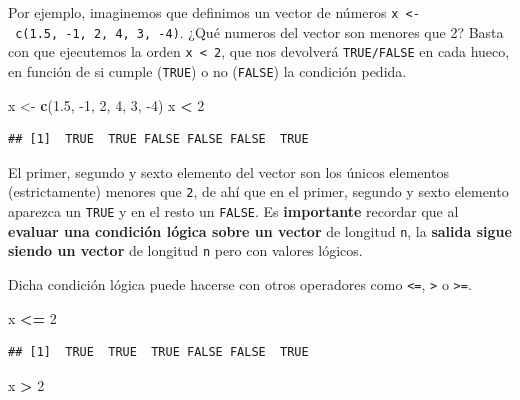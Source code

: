 \documentclass[11pt,]{book}
\newenvironment{Shaded}{\begin{snugshade}}{\end{snugshade}}
\newcommand{\DecValTok}[1]{\textcolor[rgb]{0.06,0.06,0.06}{#1}}
\newcommand{\FloatTok}[1]{\textcolor[rgb]{0.06,0.06,0.06}{#1}}
\newcommand{\KeywordTok}[1]{\textcolor[rgb]{0.27,0.27,0.27}{\textbf{#1}}}
\newcommand{\NormalTok}[1]{#1}
\newcommand{\OperatorTok}[1]{\textcolor[rgb]{0.43,0.43,0.43}{\textbf{#1}}}
\newcommand{\StringTok}[1]{\textcolor[rgb]{0.5,0.5,0.5}{#1}}
\begin{document}
Por ejemplo, imaginemos que definimos un vector de números \texttt{x\ \textless{}-\ c(1.5,\ -1,\ 2,\ 4,\ 3,\ -4)}. ¿Qué numeros del vector son menores que 2? Basta con que ejecutemos la orden \texttt{x\ \textless{}\ 2}, que nos devolverá \texttt{TRUE/FALSE} en cada hueco, en función de si cumple (\texttt{TRUE}) o no (\texttt{FALSE}) la condición pedida.

\begin{Shaded}
\begin{Highlighting}[]
\NormalTok{x <-}\StringTok{ }\KeywordTok{c}\NormalTok{(}\FloatTok{1.5}\NormalTok{, }\DecValTok{-1}\NormalTok{, }\DecValTok{2}\NormalTok{, }\DecValTok{4}\NormalTok{, }\DecValTok{3}\NormalTok{, }\DecValTok{-4}\NormalTok{)}
\NormalTok{x }\OperatorTok{<}\StringTok{ }\DecValTok{2}
\end{Highlighting}
\end{Shaded}

\begin{verbatim}
## [1]  TRUE  TRUE FALSE FALSE FALSE  TRUE
\end{verbatim}

El primer, segundo y sexto elemento del vector son los únicos elementos (estrictamente) menores que \texttt{2}, de ahí que en el primer, segundo y sexto elemento aparezca un \texttt{TRUE} y en el resto un \texttt{FALSE}. Es \textbf{importante} recordar que al \textbf{evaluar una condición lógica sobre un vector} de longitud \texttt{n}, la \textbf{salida sigue siendo un vector} de longitud \texttt{n} pero con valores lógicos.

Dicha condición lógica puede hacerse con otros operadores como \texttt{\textless{}=}, \texttt{\textgreater{}} o \texttt{\textgreater{}=}.

\begin{Shaded}
\begin{Highlighting}[]
\NormalTok{x }\OperatorTok{<=}\StringTok{ }\DecValTok{2}
\end{Highlighting}
\end{Shaded}

\begin{verbatim}
## [1]  TRUE  TRUE  TRUE FALSE FALSE  TRUE
\end{verbatim}

\begin{Shaded}
\begin{Highlighting}[]
\NormalTok{x }\OperatorTok{>}\StringTok{ }\DecValTok{2}
\end{Highlighting}
\end{Shaded}
\end{document}

